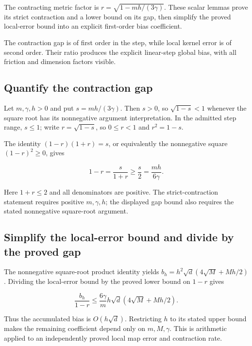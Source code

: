 \documentclass[11pt,a4paper]{report}
\begin{document}
The contracting metric factor is \(r=\sqrt{1-mh/(3\gamma)}\). These scalar lemmas prove its strict contraction and a lower bound on its gap, then simplify the proved local-error bound into an explicit first-order bias coefficient.



The contraction gap is of first order in the step, while local kernel error is of second order. Their ratio produces the explicit linear-step global bias, with all friction and dimension factors visible.

\subsection{\texorpdfstring{Quantify the contraction gap}{Quantify the contraction gap}}
\label{report-step-KineticLangevin-OBABOBiasScalar-lean-1}


Let \(m,\gamma,h>0\) and put \(s=mh/(3\gamma)\). Then \(s>0\), so \(\sqrt{1-s}<1\) whenever the square root has its nonnegative argument interpretation. In the admitted step range, \(s\le1\); write \(r=\sqrt{1-s}\), so \(0\le r<1\) and \(r^2=1-s\).



The identity \((1-r)(1+r)=s\), or equivalently the nonnegative square \((1-r)^2\ge0\), gives

\[1-r=\frac{s}{1+r}\ge\frac s2=\frac{mh}{6\gamma}.\]

Here \(1+r\le2\) and all denominators are positive. The strict-contraction statement requires positive \(m,\gamma,h\); the displayed gap bound also requires the stated nonnegative square-root argument.

\subsection{\texorpdfstring{Simplify the local-error bound and divide by the proved gap}{Simplify the local-error bound and divide by the proved gap}}
\label{report-step-KineticLangevin-OBABOBiasScalar-lean-2}


The nonnegative square-root product identity yields \(b_h=h^2\sqrt d(4\sqrt M+Mh/2)\). Dividing the local-error bound by the proved lower bound on \(1-r\) gives

\[\frac{b_h}{1-r}\le\frac{6\gamma}{m}h\sqrt d(4\sqrt M+Mh/2).\]

Thus the accumulated bias is \(O(h\sqrt d)\). Restricting \(h\) to its stated upper bound makes the remaining coefficient depend only on \(m,M,\gamma\). This is arithmetic applied to an independently proved local map error and contraction rate.
\end{document}
